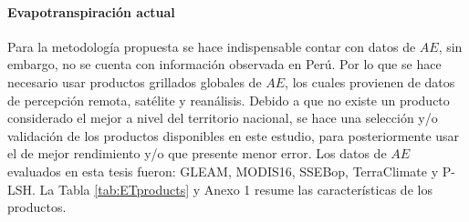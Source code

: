 \documentclass[12pt]{article}
\begin{document}


\clearpage

\paragraph{Evapotranspiración actual}\mbox{}

Para la metodología propuesta se hace indispensable contar con datos de $AE$, sin embargo, no se cuenta con información observada en Perú. Por lo que se hace necesario usar productos grillados globales de $AE$, los cuales provienen de datos de percepción remota, satélite y reanálisis. Debido a que no existe un producto considerado el mejor a nivel del territorio nacional, se hace una selección y/o validación de los productos disponibles en este estudio, para posteriormente usar el de mejor rendimiento y/o que presente menor error. Los datos de $AE$ evaluados en esta tesis fueron: GLEAM, MODIS16, SSEBop, TerraClimate y P-LSH. La Tabla \ref{tab:ETproducts} y Anexo 1 resume las características de los productos.
\end{document}
